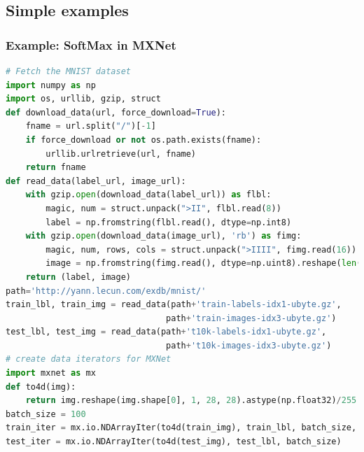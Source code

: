 \subsection{Simple examples}

\begin{frame}[fragile]
  \MyLogo
  \frametitle{Example: SoftMax in MXNet}  

\begin{lstlisting}[language=python]
# Fetch the MNIST dataset
import numpy as np
import os, urllib, gzip, struct
def download_data(url, force_download=True): 
	fname = url.split("/")[-1]
	if force_download or not os.path.exists(fname):
		urllib.urlretrieve(url, fname)
	return fname
def read_data(label_url, image_url):
	with gzip.open(download_data(label_url)) as flbl:
		magic, num = struct.unpack(">II", flbl.read(8))
		label = np.fromstring(flbl.read(), dtype=np.int8)
	with gzip.open(download_data(image_url), 'rb') as fimg:
		magic, num, rows, cols = struct.unpack(">IIII", fimg.read(16))
		image = np.fromstring(fimg.read(), dtype=np.uint8).reshape(len(label), rows, cols)
	return (label, image)
path='http://yann.lecun.com/exdb/mnist/'
train_lbl, train_img = read_data(path+'train-labels-idx1-ubyte.gz',
								path+'train-images-idx3-ubyte.gz')
test_lbl, test_img = read_data(path+'t10k-labels-idx1-ubyte.gz',
								path+'t10k-images-idx3-ubyte.gz')
# create data iterators for MXNet
import mxnet as mx
def to4d(img):
	return img.reshape(img.shape[0], 1, 28, 28).astype(np.float32)/255
batch_size = 100
train_iter = mx.io.NDArrayIter(to4d(train_img), train_lbl, batch_size, shuffle=True)
test_iter = mx.io.NDArrayIter(to4d(test_img), test_lbl, batch_size)

\end{lstlisting}

\end{frame}


